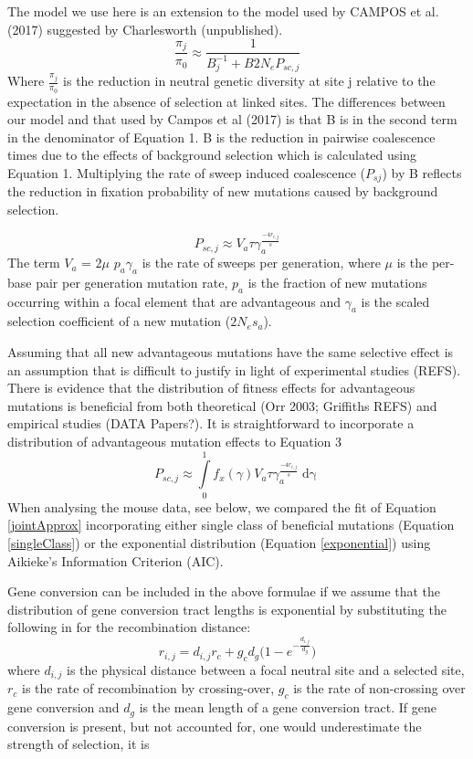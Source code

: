 \documentclass[11pt]{article}
\begin{document}
The model we use here is an extension to the model used by CAMPOS et al. (2017) suggested by Charlesworth (unpublished). 
\begin{equation}
\label{jointApprox}
\frac{\pi_{j}}{\pi_{0}} \approx  \frac{1}{B_{j}^{-1}  + B2N_eP_{sc,j}}
\end{equation}
	Where \(\frac{\pi_{j}}{\pi_{0}}\) is the reduction in neutral genetic diversity at site j relative to the expectation in the absence of selection at linked sites. The differences between our model and that used by Campos et al (2017) is that B is in the second term in the denominator of Equation 1. B is the reduction in pairwise coalescence times due to the effects of background selection which is calculated using Equation 1. Multiplying the rate of sweep induced coalescence ($P_{sj}$) by B reflects the reduction in fixation probability of new mutations caused by background selection. 

\begin{equation}
\label{singleClass}
P_{sc,j} \approx V_a \tau\gamma_a^{\frac{-4r_{i,j}}{s}} 
\end{equation}
The term $V_{a}$ = $2\mu$ $p_{a}\gamma_{a}$ is the rate of sweeps per generation, where $\mu$ is the per-base pair per generation mutation rate, $p_a$ is the fraction of new mutations occurring within a focal element that are advantageous and $\gamma_a$  is the scaled selection coefficient of a new mutation ($2N_es_a$).

	Assuming that all new advantageous mutations have the same selective effect is an assumption that is difficult to justify in light of experimental studies (REFS). There is evidence that the distribution of fitness effects for advantageous mutations is beneficial from both theoretical (Orr 2003; Griffiths REFS) and empirical studies (DATA Papers?). It is straightforward to incorporate a distribution of advantageous mutation effects to Equation 3
		\begin{equation}
		\label{exponential}
P_{sc,j} \approx \int \limits_{0}^{1} f_x(\gamma) V_a \tau\gamma_a^{\frac{-4r_{i,j}}{s}} \mathop{d\gamma}
		\end{equation}
When analysing the mouse data, see below, we compared the fit of Equation \ref{jointApprox} incorporating either single class of beneficial mutations (Equation \ref{singleClass}) or the exponential distribution (Equation \ref{exponential}) using Aikieke's Information Criterion (AIC).

	Gene conversion can be included in the above formulae if we assume that the distribution of gene conversion tract lengths is exponential  by substituting the following in for the recombination distance:
		\begin{equation}
		\label{geneConversion}
		r_{i,j} = d_{i,j} r_c + g_c d_g \Bigg( 1 - e ^{-\frac{d_{i,j}}{d_g}} \Bigg)
		\end{equation}
	where $d_{i,j}$ is the physical distance between a focal neutral site and a selected site, $r_c$ is the rate of recombination by crossing-over, $g_c$ is the rate of non-crossing over gene conversion and $d_g$ is the mean length of a gene conversion tract. If gene conversion is present, but not accounted for, one would underestimate the strength of selection, it is 
	
\end{document}
